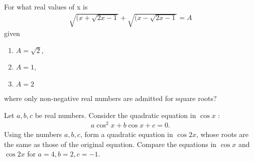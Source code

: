 \item For what real values of x is
\begin{align}
\sqrt{(x+\sqrt{2x-1}} + \sqrt{(x-\sqrt{2x-1}} = A
\end{align}
given 
\begin{enumerate}
\item  $A =\sqrt{2}$, 
\item  $A = 1$, 
\item  $A = 2$
\end{enumerate}
where only non-negative real numbers are admitted for square roots?
%
\item Let $a, b, c$ be real numbers. Consider the quadratic equation in $\cos x$ :
\begin{align}
a \cos^{2} x + b \cos x + c = 0.
\end{align}
%
Using the numbers $a, b, c$, form a quadratic equation in $\cos 2x$, whose roots are the same as those of the original equation. Compare the equations in $\cos x$ and $\cos 2x$ for $a = 4, b = 2, c = -1$.























